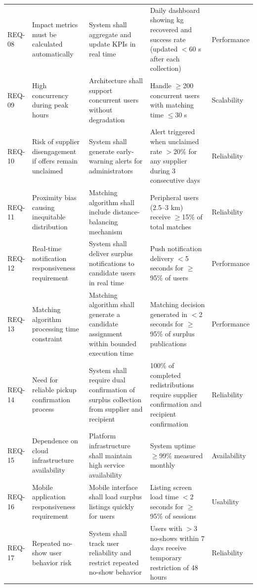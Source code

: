 \documentclass[conference]{IEEEtran}
\begin{document}
\begin{table}[!t]
{\begin{tabular}{p{1.1cm} p{3.0cm} p{4.0cm} p{4.0cm} p{1.8cm}}
REQ-08 & Impact metrics must be calculated automatically & System shall aggregate and update KPIs in real time & Daily dashboard showing kg recovered and success rate (updated $<$60 s after each collection) & Performance \\[4pt]
REQ-09 & High concurrency during peak hours & Architecture shall support concurrent users without degradation & Handle $\geq$200 concurrent users with matching time $\leq$30 s & Scalability \\[4pt]
REQ-10 & Risk of supplier disengagement if offers remain unclaimed & System shall generate early-warning alerts for administrators & Alert triggered when unclaimed rate $>$20\% for any supplier during 3 consecutive days & Reliability \\[4pt]
REQ-11 & Proximity bias causing inequitable distribution & Matching algorithm shall include distance-balancing mechanism & Peripheral users (2.5–3 km) receive $\geq$15\% of total matches & Reliability \\[4pt]
REQ-12 & Real-time notification responsiveness requirement & System shall deliver surplus notifications to candidate users in real time & Push notification delivery $<$5 seconds for $\geq$95\% of users & Performance \\[4pt]
REQ-13 & Matching algorithm processing time constraint & Matching algorithm shall generate a candidate assignment within bounded execution time & Matching decision generated in $<$2 seconds for $\geq$95\% of surplus publications & Performance \\[4pt]
REQ-14 & Need for reliable pickup confirmation process & System shall require dual confirmation of surplus collection from supplier and recipient & 100\% of completed redistributions require supplier confirmation and recipient confirmation & Reliability \\[4pt]
REQ-15 & Dependence on cloud infrastructure availability & Platform infrastructure shall maintain high service availability & System uptime $\geq$99\% measured monthly & Availability \\[4pt]
REQ-16 & Mobile application responsiveness requirement & Mobile interface shall load surplus listings quickly for users & Listing screen load time $<$2 seconds for $\geq$95\% of sessions & Usability \\[4pt]
REQ-17 & Repeated no-show user behavior risk & System shall track user reliability and restrict repeated no-show behavior & Users with $>$3 no-shows within 7 days receive temporary restriction of 48 hours & Reliability \\
\bottomrule
\end{tabular}
}

\end{table}
\end{document}
